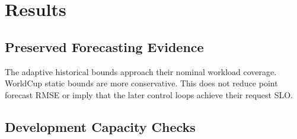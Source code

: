 \documentclass[10pt,twocolumn,a4paper]{article}
\begin{document}
\section{Results}
\subsection{Preserved Forecasting Evidence}


\begin{table}[t]\centering\small\setlength{\tabcolsep}{3pt}
\caption{Held-out historical demand upper-bound coverage (\%), nominal 90\%. This analysis uses a new calibration prefix of saved test predictions and does not change predictor weights.}\label{tab:historical}
\ifdim\wd\databox>\columnwidth\relax\resizebox{\columnwidth}{!}{\usebox{\databox}}\else\usebox{\databox}\fi
\end{table}

The adaptive historical bounds approach their nominal workload coverage. WorldCup static bounds are more conservative. This does not reduce point forecast RMSE or imply that the later control loops achieve their request SLO.
\subsection{Development Capacity Checks}

\begin{table}[t]\centering\small\setlength{\tabcolsep}{3pt}
\caption{Development measurements preceding final tests. These are single blocks per condition; sixteen-replica offered-load blocks last fifteen seconds, other blocks five. Sampling variability and host conditions limit the inferred capacity boundary.}\label{tab:capacity}
\ifdim\wd\databox>\textwidth\relax\resizebox{\textwidth}{!}{\usebox{\databox}}\else\usebox{\databox}\fi
\end{table}
\end{document}
